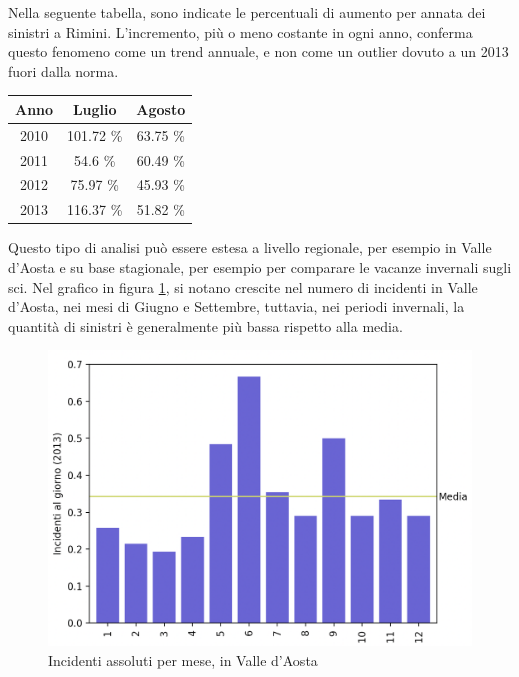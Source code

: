 \documentclass[a4paper]{report}
\begin{document}
Nella seguente tabella, sono indicate le percentuali di aumento per annata dei sinistri 
a Rimini. 
L'incremento, più o meno costante in ogni anno, conferma questo fenomeno come un trend 
annuale, e non come un outlier dovuto a un 2013 fuori dalla norma. 

\begin{center}
    \def\arraystretch{1.5}%
    \begin{tabular}{ |c|c|c| } 
    \hline
    Anno & Luglio   & Agosto \\ 
    \hline
    \rowcolor{TableGray}
    2010 & 101.72 \% & 63.75 \% \\ 
    2011 & 54.6  \%  & 60.49 \% \\
    \rowcolor{TableGray}
    2012 & 75.97 \%  & 45.93 \%\\
    2013 & 116.37 \% & 51.82 \%\\
    \hline
    \end{tabular}
\end{center}

Questo tipo di analisi può essere estesa a livello regionale, 
per esempio in Valle d'Aosta e su base stagionale, per esempio per 
comparare le vacanze invernali sugli sci. 
Nel grafico in figura \ref{fig:aosta}, si notano crescite nel numero di incidenti 
in Valle d'Aosta, nei mesi di Giugno e Settembre, tuttavia, nei periodi invernali, 
la quantità di sinistri è generalmente più bassa rispetto alla media. 

\begin{figure}
    \includegraphics[width=\linewidth]{../src/incidenti/incidenti_senza_coords/mese_incidenti/aosta_mese.png}
    \caption{Incidenti assoluti per mese, in Valle d'Aosta}
    \label{fig:aosta}
\end{figure}
\end{document}
